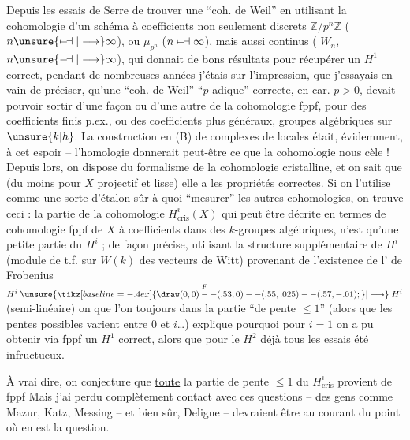 Depuis les essais de Serre de trouver une ``coh. de Weil'' en utilisant la cohomologie d'un schéma à coefficients non seulement discrets $\mathbb Z/p^n\mathbb Z$ ($n\unsure{\mapstochar\relbar\joinrel\dashv|\longrightarrow}\infty$), ou $\mu_{p^n}$ ($n\mathrel{\mapstochar\relbar\joinrel\dashv}\infty$), mais aussi continus ( $W_n$, $n\unsure{\relbar\joinrel\dashv|\longrightarrow}\infty$), qui donnait de bons résultats pour récupérer un $H^1$ correct, pendant de nombreuses années j'étais  sur l'impression, que j'essayais en vain de préciser, qu'une ``coh. de Weil'' ``$p$-adique''\unsure{:} correcte, en car. $p>0$, devait pouvoir sortir d'une façon ou d'une autre de la cohomologie fppf, pour des coefficients finis p.ex., ou des coefficients
plus généraux, groupes algébriques sur $\unsure{k|h}$. La construction en (B) de complexes de  locales était, évidemment,   à cet espoir -- l'homologie donnerait peut-être ce que la cohomologie nous cèle ! Depuis lors, on dispose du formalisme de la cohomologie cristalline, et on sait  que (du moins  pour $X$ projectif et lisse) elle a les propriétés correctes. Si on l'utilise comme une sorte d'étalon sûr à quoi ``mesurer'' les autres cohomologies, on trouve ceci : la partie de la cohomologie  $H^i_{\mathrm{cris}}(X)$ qui peut être décrite en termes de cohomologie fppf de $X$ à coefficients dans des $k$-groupes algébriques, n'est qu'une  petite partie du $H^i$ ; de façon précise, utilisant la structure  supplémentaire de $H^i$ (module de t.f. sur  $W(k)$ des vecteurs de Witt) provenant de l'existence de l' de Frobenius $H^i\mathrel{\mathop{\unsure{\tikz[baseline=-.4ex]{\draw (0,0)--(.53,0)--(.55,.025)--(.57,-.01);}|\longrightarrow}}\limits^{F}}H^i$ (semi-linéaire) on  que l'on  toujours dans la partie ``de pente $\leq 1$'' (alors que les pentes possibles varient entre $0$ et $i$\ldots)  explique pourquoi pour $i=1$
on a pu obtenir via fppf un $H^1$ correct, alors que pour le $H^2$ déjà tous les essais  été infructueux.

À vrai dire, on conjecture que \uline{toute} la partie de pente $\leq 1$ du $H^i_{\mathrm{cris}}$ provient de fppf Mais j'ai perdu complètement contact avec ces questions -- des gens comme Mazur, Katz, Messing -- et bien sûr, Deligne -- devraient être au courant du point où en est la question.


